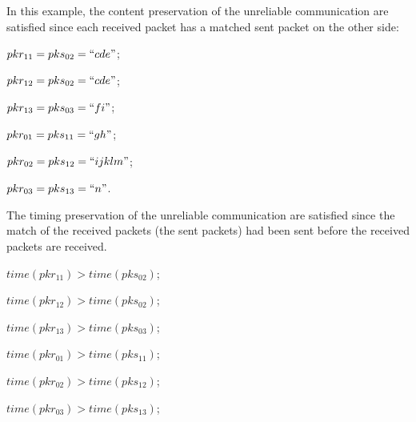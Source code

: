 In this example, the content preservation of the unreliable communication are satisfied since each received packet has a matched sent packet on the other side:

$pkr_{11} = pks_{02}=``cde"$; 

$pkr_{12} = pks_{02}=``cde"$;

$pkr_{13} = pks_{03}=``fi"$;

$pkr_{01} = pks_{11}=``gh"$;

$pkr_{02} = pks_{12}=``ijklm"$;

$pkr_{03} = pks_{13}=``n"$.

The timing preservation of the unreliable communication are satisfied since the match of the received packets (the sent packets) had been sent before the received packets are received.

$time(pkr_{11}) > time(pks_{02})$;

$time(pkr_{12}) > time(pks_{02})$; 

$time(pkr_{13}) > time(pks_{03})$;

$time(pkr_{01}) > time(pks_{11})$;

$time(pkr_{02}) > time(pks_{12})$;

$time(pkr_{03}) > time(pks_{13})$;




